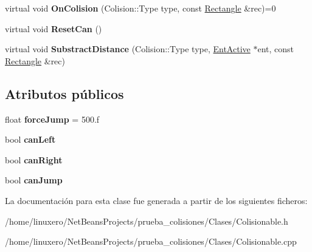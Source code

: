 \begin{DoxyCompactItemize}
\item 
\hypertarget{classColisionable_a5aa4d9e35ede30c4cd1d68a0b946d72c}{virtual void {\bfseries On\-Colision} (Colision\-::\-Type type, const \hyperlink{classRectangle}{Rectangle} \&rec)=0}\label{classColisionable_a5aa4d9e35ede30c4cd1d68a0b946d72c}

\item 
\hypertarget{classColisionable_a5826db7bec1ff455bf5570097b3c96cd}{virtual void {\bfseries Reset\-Can} ()}\label{classColisionable_a5826db7bec1ff455bf5570097b3c96cd}

\item 
\hypertarget{classColisionable_a9dbbdaf66b24a1203e2e67fc8c6bd9e5}{virtual void {\bfseries Substract\-Distance} (Colision\-::\-Type type, \hyperlink{classEntActive}{Ent\-Active} $\ast$ent, const \hyperlink{classRectangle}{Rectangle} \&rec)}\label{classColisionable_a9dbbdaf66b24a1203e2e67fc8c6bd9e5}

\end{DoxyCompactItemize}
\subsection*{Atributos públicos}
\begin{DoxyCompactItemize}
\item 
\hypertarget{classColisionable_a07729cf3ff6ed199132dd336a87887a7}{float {\bfseries force\-Jump} = 500.f}\label{classColisionable_a07729cf3ff6ed199132dd336a87887a7}

\item 
\hypertarget{classColisionable_a7742961d8b1f1a22d930bd44da27b064}{bool {\bfseries can\-Left}}\label{classColisionable_a7742961d8b1f1a22d930bd44da27b064}

\item 
\hypertarget{classColisionable_ac2faafc0b6d7e8d30e1022ebc87c206f}{bool {\bfseries can\-Right}}\label{classColisionable_ac2faafc0b6d7e8d30e1022ebc87c206f}

\item 
\hypertarget{classColisionable_ad311d7e49f065e66d479be76722770ae}{bool {\bfseries can\-Jump}}\label{classColisionable_ad311d7e49f065e66d479be76722770ae}

\end{DoxyCompactItemize}


La documentación para esta clase fue generada a partir de los siguientes ficheros\-:\begin{DoxyCompactItemize}
\item 
/home/linuxero/\-Net\-Beans\-Projects/prueba\-\_\-colisiones/\-Clases/Colisionable.\-h\item 
/home/linuxero/\-Net\-Beans\-Projects/prueba\-\_\-colisiones/\-Clases/Colisionable.\-cpp\end{DoxyCompactItemize}
